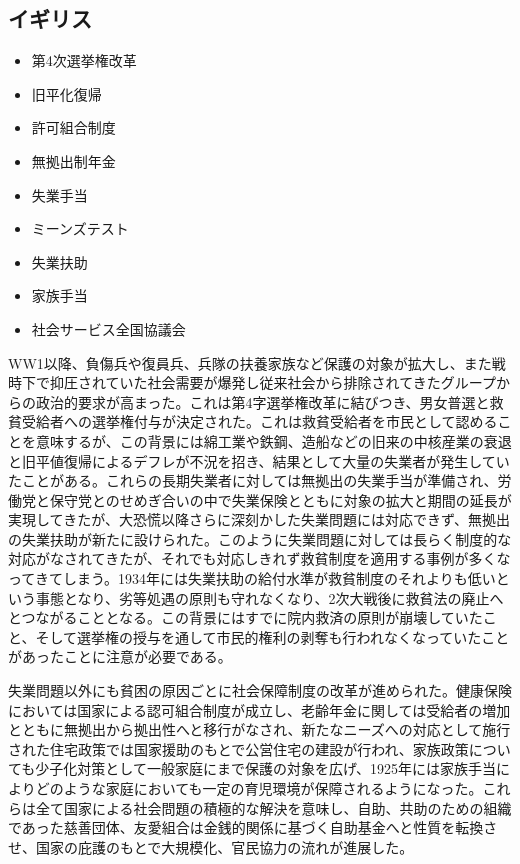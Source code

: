 \documentclass{jsarticle}
\begin{document}
\subsection{イギリス}
\begin{itemize}
	\item 第4次選挙権改革
	\item 旧平化復帰
	\item 許可組合制度
	\item 無拠出制年金
	\item 失業手当
	\item ミーンズテスト
	\item 失業扶助
	\item 家族手当
	\item 社会サービス全国協議会
\end{itemize}

WW1以降、負傷兵や復員兵、兵隊の扶養家族など保護の対象が拡大し、また戦時下で抑圧されていた社会需要が爆発し従来社会から排除されてきたグループからの政治的要求が高まった。これは第4字選挙権改革に結びつき、男女普選と救貧受給者への選挙権付与が決定された。これは救貧受給者を市民として認めることを意味するが、この背景には綿工業や鉄鋼、造船などの旧来の中核産業の衰退と旧平値復帰によるデフレが不況を招き、結果として大量の失業者が発生していたことがある。これらの長期失業者に対しては無拠出の失業手当が準備され、労働党と保守党とのせめぎ合いの中で失業保険とともに対象の拡大と期間の延長が実現してきたが、大恐慌以降さらに深刻かした失業問題には対応できず、無拠出の失業扶助が新たに設けられた。このように失業問題に対しては長らく制度的な対応がなされてきたが、それでも対応しきれず救貧制度を適用する事例が多くなってきてしまう。1934年には失業扶助の給付水準が救貧制度のそれよりも低いという事態となり、劣等処遇の原則も守れなくなり、2次大戦後に救貧法の廃止へとつながることとなる。この背景にはすでに院内救済の原則が崩壊していたこと、そして選挙権の授与を通して市民的権利の剥奪も行われなくなっていたことがあったことに注意が必要である。

失業問題以外にも貧困の原因ごとに社会保障制度の改革が進められた。健康保険においては国家による認可組合制度が成立し、老齢年金に関しては受給者の増加とともに無拠出から拠出性へと移行がなされ、新たなニーズへの対応として施行された住宅政策では国家援助のもとで公営住宅の建設が行われ、家族政策についても少子化対策として一般家庭にまで保護の対象を広げ、1925年には家族手当によりどのような家庭においても一定の育児環境が保障されるようになった。これらは全て国家による社会問題の積極的な解決を意味し、自助、共助のための組織であった慈善団体、友愛組合は金銭的関係に基づく自助基金へと性質を転換させ、国家の庇護のもとで大規模化、官民協力の流れが進展した。
\end{document}
